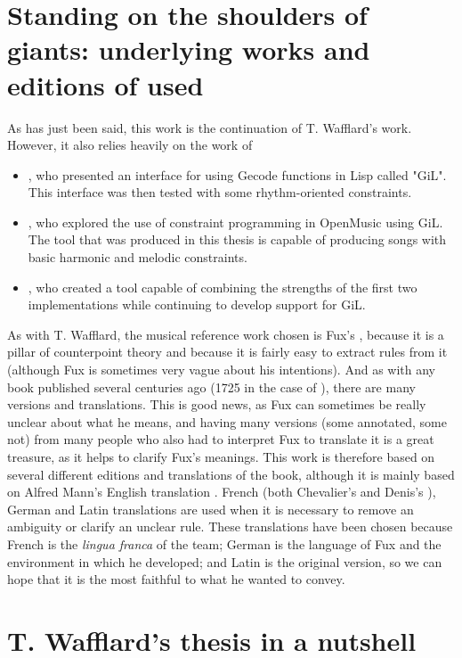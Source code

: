 \section{Standing on the shoulders of giants: underlying works and editions of \gaps used}
As has just been said, this work is the continuation of T. Wafflard's work. However, it also relies heavily on the work of
\begin{itemize}
    \item \textcite{GiLthesis}, who presented an interface for using Gecode functions in Lisp called "GiL". This interface was then tested with some rhythm-oriented constraints.
    \item \textcite{Melothesis}, who explored the use of constraint programming in OpenMusic using GiL. The tool that was produced in this thesis is capable of producing songs with basic harmonic and melodic constraints.
    \item \textcite{Melo2thesis}, who created a tool capable of combining the strengths of the first two implementations while continuing to develop support for GiL.
\end{itemize}

As with T. Wafflard, the musical reference work chosen is Fux's \gap, because it is a pillar of counterpoint theory and because it is fairly easy to extract rules from it (although Fux is sometimes very vague about his intentions). And as with any book published several centuries ago (1725 in the case of \gap), there are many versions and translations. This is good news, as Fux can sometimes be really unclear about what he means, and having many versions (some annotated, some not) from many people who also had to interpret Fux to translate it is a great treasure, as it helps to clarify Fux's meanings. This work is therefore based on several different editions and translations of the book, although it is mainly based on Alfred Mann's English translation \cite{GaPEng}. French (both Chevalier's \cite{GaPFrChevalier} and Denis's \cite{GaPFrDenis}), German \cite{GaPDe} and Latin \cite{GapLa} translations are used when it is necessary to remove an ambiguity or clarify an unclear rule. These translations have been chosen because French is the \textit{lingua franca} of the team; German is the language of Fux and the environment in which he developed; and Latin is the original version, so we can hope that it is the most faithful to what he wanted to convey.



\section{T. Wafflard's thesis in a nutshell}\label{section:thomas-in-a-nutshell}

